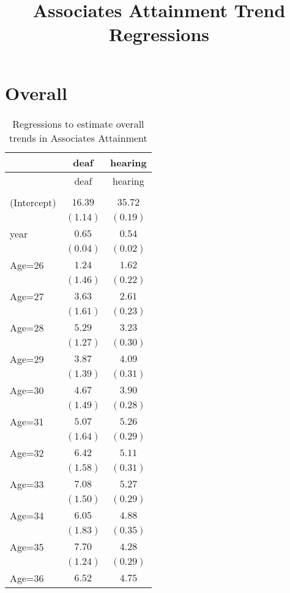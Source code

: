 \documentclass[fullpage]{paper}
\title{ Associates Attainment Trend Regressions}
\begin{document}
\section{Overall}

\begin{center}
\begin{longtable}{l c c }
\hline
 & deaf & hearing \\
\hline
\endfirsthead
\hline
 & deaf & hearing \\
\hline
\endhead
\hline
\endfoot
\hline
\multicolumn{3}{l}{\scriptsize{}}\\
\caption{Regressions to estimate overall trends in Associates Attainment}
\label{table:coefficients}
\endlastfoot
(Intercept) & $16.39$  & $35.72$  \\
            & $(1.14)$ & $(0.19)$ \\
year        & $0.65$   & $0.54$   \\
            & $(0.04)$ & $(0.02)$ \\
Age=26      & $1.24$   & $1.62$   \\
            & $(1.46)$ & $(0.22)$ \\
Age=27      & $3.63$   & $2.61$   \\
            & $(1.61)$ & $(0.23)$ \\
Age=28      & $5.29$   & $3.23$   \\
            & $(1.27)$ & $(0.30)$ \\
Age=29      & $3.87$   & $4.09$   \\
            & $(1.39)$ & $(0.31)$ \\
Age=30      & $4.67$   & $3.90$   \\
            & $(1.49)$ & $(0.28)$ \\
Age=31      & $5.07$   & $5.26$   \\
            & $(1.64)$ & $(0.29)$ \\
Age=32      & $6.42$   & $5.11$   \\
            & $(1.58)$ & $(0.31)$ \\
Age=33      & $7.08$   & $5.27$   \\
            & $(1.50)$ & $(0.29)$ \\
Age=34      & $6.05$   & $4.88$   \\
            & $(1.83)$ & $(0.35)$ \\
Age=35      & $7.70$   & $4.28$   \\
            & $(1.24)$ & $(0.29)$ \\
Age=36      & $6.52$   & $4.75$   \\

\end{longtable}
\end{center}
\end{document}
